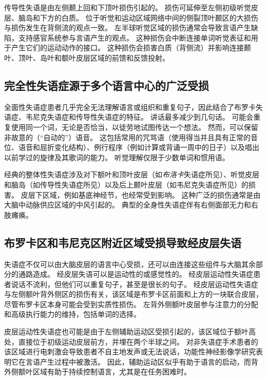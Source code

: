 传导性失语是由左侧颞上回和下顶叶损伤引起的。
损伤可延伸至左侧初级听觉皮层、脑岛和下方的白质。
位于听觉和运动区域网络中间的侧裂顶叶颞区的大损伤与损伤发生在背侧流的观点一致。
左半球听觉区域的损伤通常会导致言语产生缺陷，支持感官系统参与言语产生的观点。
这种损伤会中断连接单词听觉表征和用于产生它们的运动动作的接口。
这种损伤会损害白质（背侧流）并影响连接颞叶、顶叶、岛叶和额叶皮层区域的前馈和反馈投射。



\subsection{完全性失语症源于多个语言中心的广泛受损}

全面性失语症患者几乎完全无法理解语言或组织和重复句子，因此结合了布罗卡失语症、韦尼克失语症和传导性失语症的特征。
讲话最多减少到几句话。
可能会重复使用同一个词，无论是否恰当，以徒劳地试图传达一个想法。
然而，可以保留非故意的（“自动的”）语音。
这包括常用的咒骂语（使用得当并且具有正常的音位、语音和屈折变化结构）、例行程序（例如计算或背诵一周中的日子）以及唱出以前学过的旋律及其歌词的能力。
听觉理解仅限于少数单词和惯用语。


经典的整体性失语症涉及对下额叶和顶叶皮层（如\textit{布洛卡}失语症所见）、听觉皮层和脑岛（如传导性失语症所见）以及后上颞叶皮层（如韦尼克失语症所见）的损害。
皮层下区域，例如基底神经节，也经常受到影响。
这种广泛的损伤通常是由大脑中动脉供应区域的中风引起的。
典型的全身性失语症伴有右侧面部无力和右肢瘫痪。



\subsection{布罗卡区和韦尼克区附近区域受损导致经皮层失语}

失语症不仅可以由大脑皮层的语言中心受损，还可以由连接这些组件与大脑其余部分的通路造成。
经皮层失语可以是运动性的或感觉性的。
经皮层运动性失语症患者说话不流利，但他们可以重复句子，甚至是很长的句子。
经皮层运动性失语症与左侧额叶背外侧区的损伤有关，该区域是布罗卡区前面和上方的一块联合皮层，尽管布罗卡区本身可能会受到实质性损伤。
左背外侧额叶皮层参与注意力的分配和高级执行能力的维持，包括单词的选择。


皮层运动性失语症也可能是由于左侧辅助运动区受损引起的，该区域位于额叶高处，直接位于初级运动皮层前方，并埋在两个半球之间。
对非失语症手术患者的该区域进行电刺激会导致患者不自主地发声或无法说话，功能性神经影像学研究表明它在言语产生过程中被激活。
因此，辅助运动区似乎有助于语言的启动，而背外侧额叶区域有助于持续控制语言，尤其是在任务困难时。


